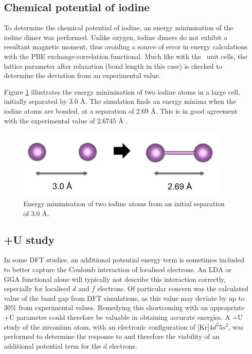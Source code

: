 \subsection{Chemical potential of iodine}

To determine the chemical potential of iodine, an energy minimisation of the iodine dimer was performed. Unlike oxygen, iodine dimers do not exhibit a resultant magnetic moment, thus avoiding a source of error in energy calculations with the PBE exchange-correlation functional. Much like with the \zirconia\ unit cells, the lattice parameter after relaxation (bond length in this case) is checked to determine the deviation from an experimental value.

Figure \ref{figure:iodine_dimer} illustrates the energy minimisation of two iodine atoms in a large cell, initially separated by 3.0 \r{A}. The simulation finds an energy minima when the iodine atoms are bonded, at a separation of 2.69 \r{A}. This is in good agreement with the experimental value of 2.6745 \r{A} \cite{ukaji1966effect}.

\begin{figure}[htp] %
\centering
\includegraphics[height=3.5cm]{images/iodine_geom.png}
\caption{Energy minimisation of two iodine atoms from an initial separation of 3.0 \r{A}.}
\label{figure:iodine_dimer}
\end{figure}

\subsection{+U study}

In some DFT studies, an additional potential energy term is sometimes included to better capture the Coulomb interaction of localised electrons. An LDA or GGA functional alone will typically not describe this interaction correctly, especially for localised $d$ and $f$ electrons. Of particular concern was the calculated value of the band gap from DFT simulations, as this value may deviate by up to 30\% from experimental values. Remedying this shortcoming with an appropriate +U parameter could therefore be valuable in obtaining accurate energies. A +U study of the zirconium atom, with an electronic configuration of [Kr]$4d^{2}5s^{2}$, was performed to determine the response to and therefore the viability of an additional potential term for the $d$ electrons.

